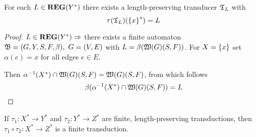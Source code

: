 \begin{theorem}
For each $L \in \mbox{{\bf REG}}(Y^*)$ there exists a length-preserving transducer
$\mbox{$\mathfrak{T}$}_L$ with \[ \tau(\mbox{$\mathfrak{T}$}_L)(\mbox{$\{x\}$}^*) = L \]
\end{theorem}

\begin{proof}
$L \in \mbox{{\bf REG}}(Y^*) \Rightarrow$ there exists a finite automaton $\mbox{$\mathfrak{B}$} =
(G, Y, S, F, \beta),\ G= (V, E)$ with $L = \beta(\mbox{$\mathfrak{W}({G})$}(S, F))$. For $X =
\mbox{$\{x\}$}$ set $\alpha(e) = x$ for all edges $e \in E$.

Then $\alpha^{-1}(X^*) \cap \mbox{$\mathfrak{W}({G})$}(S, F) = \mbox{$\mathfrak{W}({G})$}(S, F)$, from which
follows \[\beta(\alpha^{-1}(X^*) \cap \mbox{$\mathfrak{W}({G})$}(S, F)) = L\]
\end{proof}

\bigskip
\begin{theorem}
If $\tau_1 : X^* \to Y^*$ and $\tau_2 : Y^* \to Z^*$ are finite,
length-preserving transductions, then $\tau_1 \circ \tau_2 : X^* \to Z^*$ is a
finite transduction.
\end{theorem}

